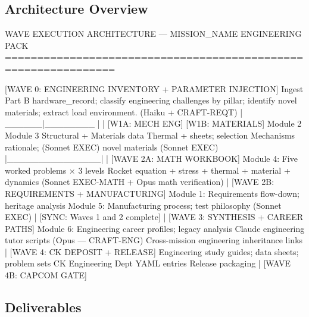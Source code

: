 \documentclass[11pt,letterpaper]{article}
\begin{document}
\subsection{Architecture Overview}

\begin{asciibox}
WAVE EXECUTION ARCHITECTURE — {MISSION_NAME} ENGINEERING PACK
===============================================================

  [WAVE 0: ENGINEERING INVENTORY + PARAMETER INJECTION]
  Ingest Part B hardware_record; classify engineering challenges
  by pillar; identify novel materials; extract load environment.
  (Haiku + CRAFT-REQT)
         |
   ______|________
  |               |
[W1A: MECH ENG]  [W1B: MATERIALS]
 Module 2          Module 3
 Structural +      Materials data
 Thermal +         sheets; selection
 Mechanisms        rationale;
 (Sonnet EXEC)     novel materials
                   (Sonnet EXEC)
  |_______________|
         |
  [WAVE 2A: MATH WORKBOOK]
  Module 4: Five worked problems × 3 levels
  Rocket equation + stress + thermal + material + dynamics
  (Sonnet EXEC-MATH + Opus math verification)
         |
  [WAVE 2B: REQUIREMENTS + MANUFACTURING]
  Module 1: Requirements flow-down; heritage analysis
  Module 5: Manufacturing process; test philosophy
  (Sonnet EXEC)
         |
  [SYNC: Waves 1 and 2 complete]
         |
  [WAVE 3: SYNTHESIS + CAREER PATHS]
  Module 6: Engineering career profiles; legacy analysis
  Claude engineering tutor scripts (Opus — CRAFT-ENG)
  Cross-mission engineering inheritance links
         |
  [WAVE 4: CK DEPOSIT + RELEASE]
  Engineering study guides; data sheets; problem sets
  CK Engineering Dept YAML entries
  Release packaging
         |
  [WAVE 4B: CAPCOM GATE]
\end{asciibox}

\subsection{Deliverables}
\end{document}
